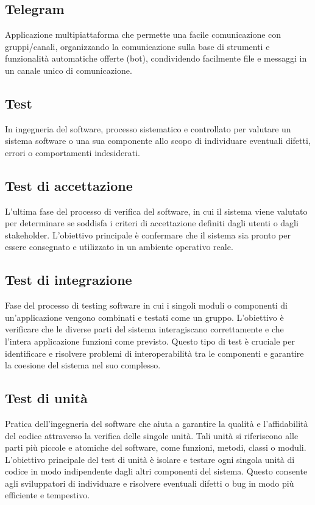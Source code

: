 \section{}

\hypertarget{sec:telegram}{}
\subsection*{Telegram}
Applicazione multipiattaforma che permette una facile comunicazione con gruppi/canali, organizzando la comunicazione sulla base di strumenti e 
funzionalità automatiche offerte (bot), condividendo facilmente file e messaggi in un canale unico di comunicazione.

\hypertarget{sec:test}{}
\subsection*{Test}
In ingegneria del software, processo sistematico e controllato per valutare un sistema software o una sua componente allo scopo di individuare eventuali 
difetti, errori o comportamenti indesiderati.

\hypertarget{sec:test_accettazione}{}
\subsection*{Test di accettazione}
L’ultima fase del processo di verifica del software, in cui il sistema viene valutato per determinare se soddisfa i criteri di
accettazione definiti dagli utenti o dagli stakeholder. L’obiettivo principale è confermare che il sistema sia pronto per essere
consegnato e utilizzato in un ambiente operativo reale.

\hypertarget{sec:test_integrazione}{}
\subsection*{Test di integrazione}
Fase del processo di testing software in cui i singoli moduli o componenti di un’applicazione vengono combinati e testati come un
gruppo. L’obiettivo è verificare che le diverse parti del sistema interagiscano correttamente e che l’intera applicazione funzioni
come previsto. Questo tipo di test è cruciale per identificare e risolvere problemi di interoperabilità tra le componenti e garantire
la coesione del sistema nel suo complesso.

\hypertarget{sec:test_unità}{}
\subsection*{Test di unità}
Pratica dell’ingegneria del software che aiuta a garantire la qualità e l’affidabilità del codice attraverso la verifica delle
singole unità. Tali unità si riferiscono alle parti più piccole e atomiche del software, come funzioni, metodi, classi o moduli.
L’obiettivo principale del test di unità è isolare e testare ogni singola unità di codice in modo indipendente dagli altri componenti
del sistema. Questo consente agli sviluppatori di individuare e risolvere eventuali difetti o bug in modo più efficiente e tempestivo.

